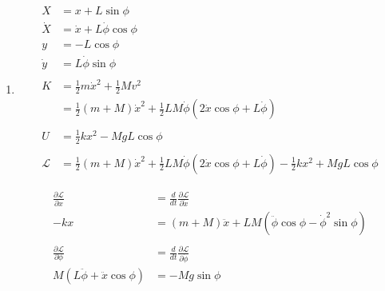 \documentclass{article}
\begin{document}
\begin{enumerate}
  \item

        \begin{align*}
          X           & = x + L \sin \phi                                                                                                                       \\
          \dot{X}     & = \dot{x} + L \dot{\phi} \cos \phi                                                                                                      \\
          y           & = -L \cos \phi                                                                                                                          \\
          \dot{y}     & = L \dot{\phi} \sin \phi                                                                                                                \\ \\
          K           & = \frac{1}{2} m \dot{x}^2 + \frac{1}{2} M v^2                                                                                           \\
                      & = \frac{1}{2} (m + M) \dot{x}^2 + \frac{1}{2} L M \dot{\phi} (2 \dot{x} \cos \phi + L \dot{\phi})                                       \\ \\
          U           & = \frac{1}{2} k x^2 - M g L \cos \phi                                                                                                   \\ \\
          \mathcal{L} & = \frac{1}{2} (m + M) \dot{x}^2 + \frac{1}{2} L M \dot{\phi} (2 \dot{x} \cos \phi + L \dot{\phi}) - \frac{1}{2} k x^2 + M g L \cos \phi
        \end{align*}

        \begin{align*}
          \frac{\partial \mathcal{L}}{\partial x}    & = \frac{d}{d t} \frac{\partial \mathcal{L}}{\partial \dot{x}}             \\
          -k x                                       & = (m + M) \ddot{x} + L M (\ddot{\phi} \cos \phi - \dot{\phi}^2 \sin \phi) \\ \\
          \frac{\partial \mathcal{L}}{\partial \phi} & = \frac{d}{d t} \frac{\partial \mathcal{L}}{\partial \dot{\phi}}          \\
          M (L \ddot{\phi} + \ddot{x} \cos \phi)     & = -M g \sin \phi
        \end{align*}


\end{enumerate}
\end{document}
